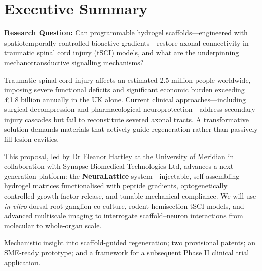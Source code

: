 \section{Executive Summary}

\begin{tcolorbox}[infobox]
\textbf{Research Question:} Can programmable hydrogel scaffolds---engineered with
spatiotemporally controlled bioactive gradients---restore axonal connectivity in
traumatic spinal cord injury (tSCI) models, and what are the underpinning
mechanotransductive signalling mechanisms?
\end{tcolorbox}

\vspace{4pt}

Traumatic spinal cord injury affects an estimated 2.5 million people worldwide, imposing
severe functional deficits and significant economic burden exceeding \pounds 1.8 billion
annually in the UK alone. Current clinical approaches---including surgical decompression
and pharmacological neuroprotection---address secondary injury cascades but fail to
reconstitute severed axonal tracts. A transformative solution demands materials that
actively guide regeneration rather than passively fill lesion cavities.

This proposal, led by Dr Eleanor Hartley at the University of Meridian in collaboration
with Synapse Biomedical Technologies Ltd, advances a next-generation platform: the
\textbf{NeuraLattice} system---injectable, self-assembling hydrogel matrices
functionalised with peptide gradients, optogenetically controlled growth factor release,
and tunable mechanical compliance. We will use \textit{in vitro} dorsal root ganglion
co-culture, rodent hemisection tSCI models, and advanced multiscale imaging to
interrogate scaffold--neuron interactions from molecular to whole-organ scale.

\medskip
\noindent{} Mechanistic insight into scaffold-guided regeneration;
two provisional patents; an SME-ready prototype; and a framework for a subsequent Phase II
clinical trial application.

